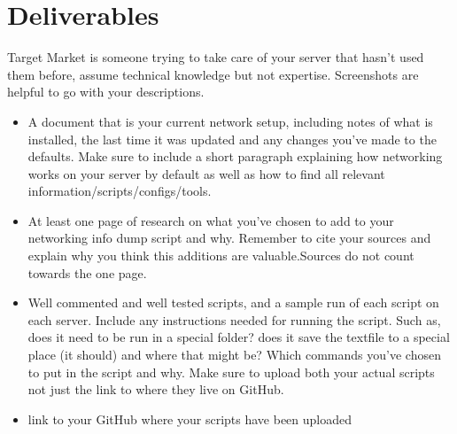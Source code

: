 \documentclass[12pt]{article}
\begin{document}
\section*{Deliverables}
Target Market is someone trying to take care of your server that hasn't used them before, assume technical knowledge but not expertise.  Screenshots are helpful to go with your descriptions. 

\begin{itemize}
    \item A  document that is your current network setup, including notes of what is installed, the last time it was updated and any changes you've made to the defaults. Make sure to include a short paragraph explaining how networking works on your server by default as well as how to find all relevant information/scripts/configs/tools.
    \item At least one page of research on what you've chosen to add to your networking info dump script and why.  Remember to cite your sources and explain why you think this additions are valuable.Sources do not count towards the one page.
    \item Well commented and well tested scripts, and a sample run of each script on each server.  Include any instructions needed for running the script.  Such as, does it need to be run in a special folder? does it save the textfile to a special place (it should) and where that might be? Which commands you've chosen to put in the script and why.  Make sure to upload both your actual scripts not just the link to where they live on GitHub.
    \item link to your GitHub where your scripts have been uploaded
\end{itemize}
\end{document}
